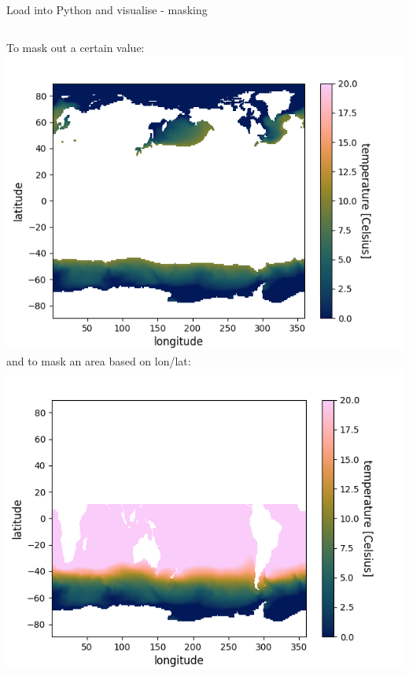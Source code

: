   
\begin{frame}{\insertsectionnumber{ |} Load into Python and visualise - masking} 
    \begin{columns}
        \column[c]{6.5cm}
        To mask out a certain value:
            \vspace{0.5cm}
        \centering\includegraphics[scale=0.25]{images/Script1_fig5.png}
            \vspace{0.5cm}
        \column[c]{6.5cm}
        and to mask an area based on lon/lat:
            \vspace{0.3cm}
        \includegraphics[scale=0.25]{images/Script1_fig6.png}
            \vspace{0.3cm}
    \end{columns}
\end{frame}

